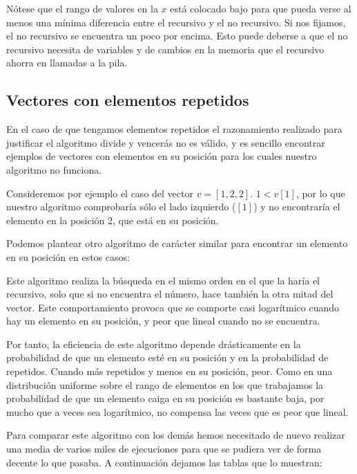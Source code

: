 Nótese que el rango de valores en la $x$ está colocado bajo para que pueda verse al menos una mínima diferencia entre el recursivo y el no recursivo. Si nos fijamos, el no recursivo se encuentra un poco por encima. Esto puede deberse a que el no recursivo necesita de variables y de cambios en la memoria que el recursivo ahorra en llamadas a la pila.


\subsection{Vectores con elementos repetidos}

En el caso de que tengamos elementos repetidos el razonamiento realizado para justificar el algoritmo divide y vencerás no es válido, y es sencillo encontrar ejemplos de vectores con elementos en su posición para los cuales nuestro algoritmo no funciona.

Consideremos por ejemplo el caso del vector $v = [1,2,2]$. $1 <v[1]$, por lo que nuestro algoritmo comprobaría sólo el lado izquierdo ($[1]$) y no encontraría el elemento en la posición 2, que está en su posición.

Podemos plantear otro algoritmo de carácter similar para encontrar un elemento en su posición en estos casos:



Este algoritmo realiza la búsqueda en el mismo orden en el que la haría el recursivo, solo que si no encuentra el número, hace también la otra mitad del vector. Este comportamiento provoca que se comporte casi logarítmico cuando hay un elemento en su posición, y peor que lineal cuando no se encuentra.

Por tanto, la eficiencia de este algoritmo depende drásticamente en la probabilidad de que un elemento esté en su posición y en la probabilidad de repetidos. Cuando más repetidos y menos en su posición, peor. Como en una distribución uniforme sobre el rango de elementos en los que trabajamos la probabilidad de que un elemento caiga en su posición es bastante baja, por mucho que a veces sea logarítmico, no compensa las veces que es peor que lineal.

Para comparar este algoritmo con los demás hemos necesitado de nuevo realizar una media de varios miles de ejecuciones para que se pudiera ver de forma decente lo que pasaba. A continuación dejamos las tablas que lo muestran:


